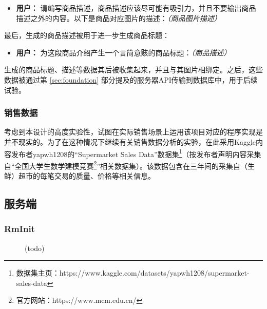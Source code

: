 \begin{itemize}
    \item[] \textbf{用户：} 请编写商品描述，商品描述应该尽可能有吸引力，并且不要输出商品描述之外的内容。以下是商品对应图片的描述：\textit{（商品图片描述）}
\end{itemize}

最后，生成的商品描述被用于进一步生成商品标题：

\begin{itemize}
    \item[] \textbf{用户：} 为这段商品介绍产生一个言简意赅的商品标题：\textit{（商品描述）}
\end{itemize}

生成的商品标题、描述等数据其后被收集起来，并且与其图片相绑定。之后，这些数据被通过第 \ref{sec:foundation} 部分提及的服务器API传输到数据库中，用于后续试验。

\subsubsection{销售数据}

考虑到本设计的高度实验性，试图在实际销售场景上运用该项目对应的程序实现是并不现实的。为了在这种情况下继续有关销售数据分析的实验，在此采用Kaggle内容发布者yapwh1208的“Supermarket Sales Data”数据集\footnote{数据集主页：https://www.kaggle.com/datasets/yapwh1208/supermarket-sales-data}（按发布者声明内容采集自“全国大学生数学建模竞赛\footnote{官方网站：https://www.mcm.edu.cn/}”相关数据集）。该数据包含在三年间的采集自（生鲜）超市的每笔交易的质量、价格等相关信息。

\subsection{服务端}

\subsubsection{RmInit}


\begin{figure}[htbp]
    \hfill
	\caption{(todo)}
	\label{fig:rminit}
\end{figure}

